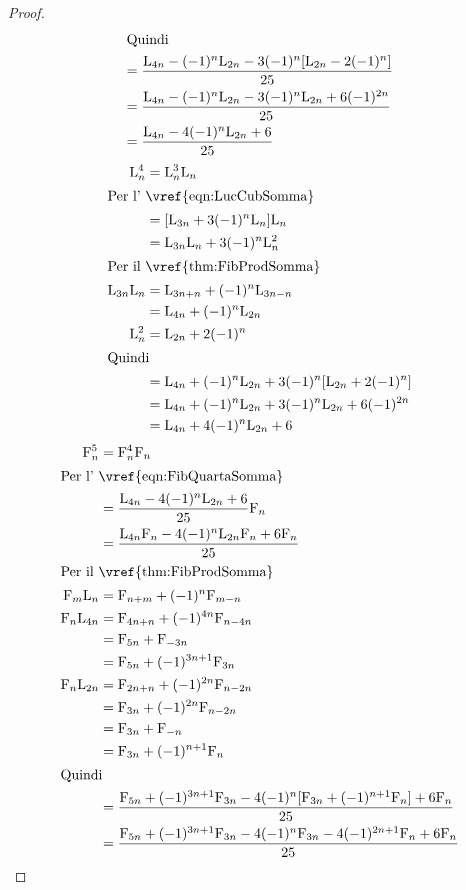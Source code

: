 \begin{proof}
\begin{align*}
\intertext{Quindi}
={}&\dfrac{\mathrm{L}_{4n}-(-1)^n\mathrm{L}_{2n}-3(-1)^n[\mathrm{L}_{2n}-2(-1)^n]}{25}\\
={}&\dfrac{\mathrm{L}_{4n}-(-1)^n\mathrm{L}_{2n}-3(-1)^n\mathrm{L}_{2n}+6(-1)^{2n}}{25}\\
={}&\dfrac{\mathrm{L}_{4n}-4(-1)^n\mathrm{L}_{2n}+6}{25}\\
\end{align*}
\begin{align*}
\Luc{n}^4={}&\Luc{n}^3\Luc{n}\\
\intertext{Per l'~\vref{eqn:LucCubSomma}}
={}&[\Luc{3n}+3(-1)^n\Luc{n}]\Luc{n}\\
={}&\Luc{3n}\Luc{n}+3(-1)^n\Luc{n}^2\\
\intertext{Per il~\vref{thm:FibProdSomma}}
\Luc{3n}\Luc{n}={}&\Luc{3n+n}+(-1)^n\Luc{3n-n}\\
={}&\Luc{4n}+(-1)^n\Luc{2n}\\
\Luc{n}^2={}&\Luc{2n}+2(-1)^n\\
\intertext{Quindi}
={}&\Luc{4n}+(-1)^n\Luc{2n}+3(-1)^n[\Luc{2n}+2(-1)^n]\\
={}&\Luc{4n}+(-1)^n\Luc{2n}+3(-1)^n\Luc{2n}+6(-1)^{2n}\\
={}&\Luc{4n}+4(-1)^n\Luc{2n}+6\\
\end{align*}
\begin{align*}
	\Fib{n}^5={}&\Fib{n}^4\Fib{n}\\
	\intertext{Per l'~\vref{eqn:FibQuartaSomma}}
	={}&\dfrac{\Luc{4n}-4(-1)^n\Luc{2n}+6}{25}\Fib{n}\\
	={}&\dfrac{\Luc{4n}\Fib{n}-4(-1)^n\Luc{2n}\Fib{n}+6\Fib{n}}{25}\\
	\intertext{Per il~\vref{thm:FibProdSomma}}
	\Fib{m}\Luc{n}={}&\Fib{n+m}+(-1)^n\Fib{m-n}\\
	\Fib{n}\Luc{4n}={}&\Fib{4n+n}+(-1)^{4n}\Fib{n-4n}\\
	={}&\Fib{5n}+\Fib{-3n}\\
	={}&\Fib{5n}+(-1)^{3n+1}\Fib{3n}\\
	\Fib{n}\Luc{2n}={}&\Fib{2n+n}+(-1)^{2n}\Fib{n-2n}\\
	={}&\Fib{3n}+(-1)^{2n}\Fib{n-2n}\\
	={}&\Fib{3n}+\Fib{-n}\\
	={}&\Fib{3n}+(-1)^{n+1}\Fib{n}\\
	\intertext{Quindi}
	={}&\dfrac{\Fib{5n}+(-1)^{3n+1}\Fib{3n}-4(-1)^n[\Fib{3n}+(-1)^{n+1}\Fib{n}]+6\Fib{n}}{25}\\
	={}&\dfrac{\Fib{5n}+(-1)^{3n+1}\Fib{3n}-4(-1)^n\Fib{3n}-4(-1)^{2n+1}\Fib{n}+6\Fib{n}}{25}\\

\end{align*}
\end{proof}
